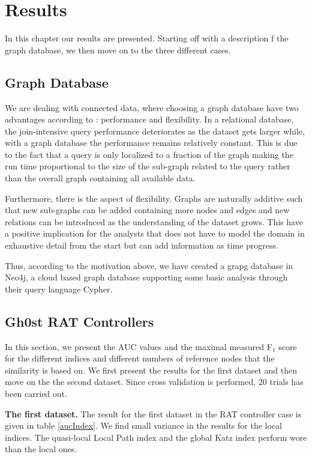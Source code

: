 \chapter{Results}
In this chapter our results are presented. Starting off with a description f the graph database, we then move on to the three different cases. 

\section{Graph Database}
We are dealing with connected data, where choosing a graph database have two advantages according to \citet{robinson2013}: performance and flexibility. In a relational database, the join-intensive query performance deteriorates as the dataset gets larger while, with a graph database the performance remains relatively constant. This is due to the fact that a query is only localized to a fraction of the graph making the run time proportional to the size of the sub-graph related to the query rather than the overall graph containing all available data.

Furthermore, there is the aspect of flexibility. Graphs are naturally additive \cite{robinson2013} such that new sub-graphs can be added containing more nodes and edges and new relations can be introduced as the understanding of the dataset grows. This have a positive implication for the analysts that does not have to model the domain in exhaustive detail from the start but can add information as time progress. 

Thus, according to the motivation above, we have created a grapg database in Neo4j, a cloud based graph database supporting some basic analysis through their query language Cypher.

\section{Gh0st RAT Controllers}
In this section, we present the AUC values and the maximal measured F$_1$ score for the different indices and different numbers of reference nodes that the similarity is based on. We first present the results for the first dataset and then move on the the second dataset. Since cross validation is performed, 20 trials has been carried out.

\textbf{The first dataset.} The result for the first dataset in the RAT controller case is given in table \ref{aucIndex}. We find small variance in the results for the local indices. The quasi-local Local Path index and the global Katz index perform wore than the local ones. 

